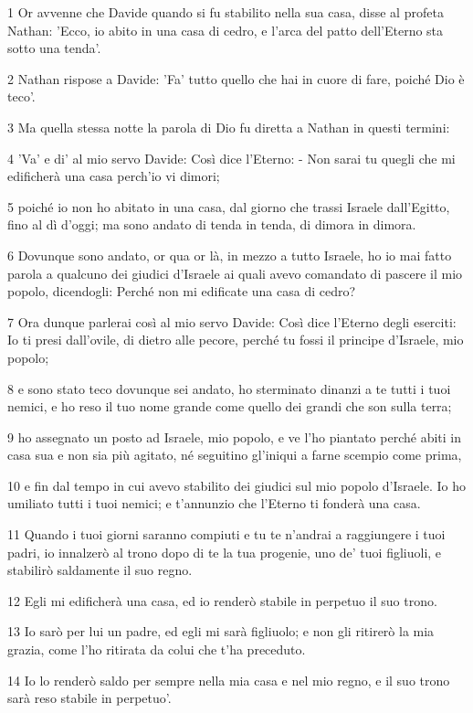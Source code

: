 \par 1 Or avvenne che Davide quando si fu stabilito nella sua casa, disse al profeta Nathan: 'Ecco, io abito in una casa di cedro, e l'arca del patto dell'Eterno sta sotto una tenda'.
\par 2 Nathan rispose a Davide: 'Fa' tutto quello che hai in cuore di fare, poiché Dio è teco'.
\par 3 Ma quella stessa notte la parola di Dio fu diretta a Nathan in questi termini:
\par 4 'Va' e di' al mio servo Davide: Così dice l'Eterno: - Non sarai tu quegli che mi edificherà una casa perch'io vi dimori;
\par 5 poiché io non ho abitato in una casa, dal giorno che trassi Israele dall'Egitto, fino al dì d'oggi; ma sono andato di tenda in tenda, di dimora in dimora.
\par 6 Dovunque sono andato, or qua or là, in mezzo a tutto Israele, ho io mai fatto parola a qualcuno dei giudici d'Israele ai quali avevo comandato di pascere il mio popolo, dicendogli: Perché non mi edificate una casa di cedro?
\par 7 Ora dunque parlerai così al mio servo Davide: Così dice l'Eterno degli eserciti: Io ti presi dall'ovile, di dietro alle pecore, perché tu fossi il principe d'Israele, mio popolo;
\par 8 e sono stato teco dovunque sei andato, ho sterminato dinanzi a te tutti i tuoi nemici, e ho reso il tuo nome grande come quello dei grandi che son sulla terra;
\par 9 ho assegnato un posto ad Israele, mio popolo, e ve l'ho piantato perché abiti in casa sua e non sia più agitato, né seguitino gl'iniqui a farne scempio come prima,
\par 10 e fin dal tempo in cui avevo stabilito dei giudici sul mio popolo d'Israele. Io ho umiliato tutti i tuoi nemici; e t'annunzio che l'Eterno ti fonderà una casa.
\par 11 Quando i tuoi giorni saranno compiuti e tu te n'andrai a raggiungere i tuoi padri, io innalzerò al trono dopo di te la tua progenie, uno de' tuoi figliuoli, e stabilirò saldamente il suo regno.
\par 12 Egli mi edificherà una casa, ed io renderò stabile in perpetuo il suo trono.
\par 13 Io sarò per lui un padre, ed egli mi sarà figliuolo; e non gli ritirerò la mia grazia, come l'ho ritirata da colui che t'ha preceduto.
\par 14 Io lo renderò saldo per sempre nella mia casa e nel mio regno, e il suo trono sarà reso stabile in perpetuo'.
